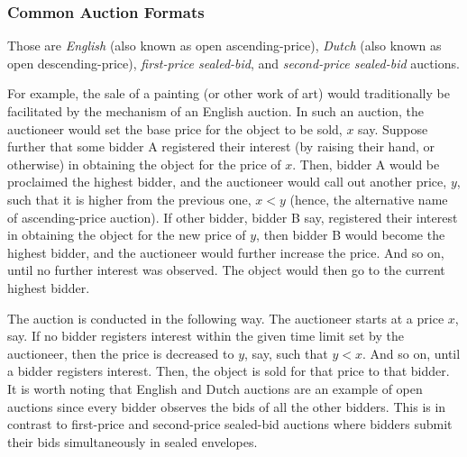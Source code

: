 \subsubsection{Common Auction Formats} %
\label{ssub:common_auction_formats_dmp}
 Those are \emph{English} (also known as open ascending-price), \emph{Dutch} (also known as open descending-price), \emph{first-price sealed-bid}, and \emph{second-price sealed-bid} auctions.

 For example, the sale of a painting (or other work of art) would traditionally be facilitated by the mechanism of an English auction. In such an auction, the auctioneer would set the base price for the object to be sold, $x$ say. Suppose further that some bidder A registered their interest (by raising their hand, or otherwise) in obtaining the object for the price of $x$. Then, bidder A would be proclaimed the highest bidder, and the auctioneer would call out another price, $y$, such that it is higher from the previous one, $x < y$ (hence, the alternative name of ascending-price auction). If other bidder, bidder B say, registered their interest in obtaining the object for the new price of $y$, then bidder B would become the highest bidder, and the auctioneer would further increase the price. And so on, until no further interest was observed. The object would then go to the current highest bidder.

 The auction is conducted in the following way. The auctioneer starts at a price $x$, say. If no bidder registers interest within the given time limit set by the auctioneer, then the price is decreased to $y$, say, such that $y < x$. And so on, until a bidder registers interest. Then, the object is sold for that price to that bidder. It is worth noting that English and Dutch auctions are an example of open auctions since every bidder observes the bids of all the other bidders. This is in contrast to first-price and second-price sealed-bid auctions where bidders submit their bids simultaneously in sealed envelopes.

